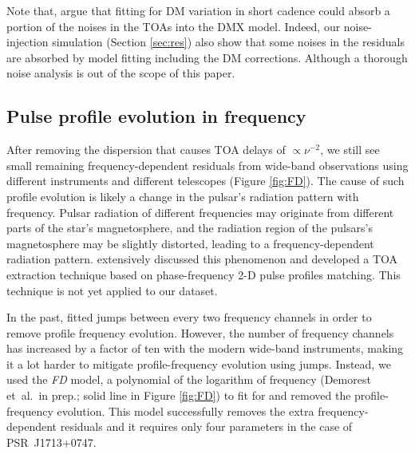 Note that, \citet{kcs+13} argue that fitting for DM variation in short cadence could
absorb a portion of the noises in the TOAs into the DMX model. 
Indeed, our noise-injection simulation (Section \ref{sec:res})
also show that some noises in the residuals are absorbed by model fitting
including the DM corrections. Although a thorough noise analysis is out of the scope of
this paper.


\subsection{Pulse profile evolution in frequency}
\label{sec:FD}
After removing the dispersion that causes TOA delays of $\propto \nu^{-2}$,
 we still see small remaining frequency-dependent residuals from wide-band
observations using
different instruments and different telescopes (Figure \ref{fig:FD}).  
The cause of such profile evolution is likely a change in the pulsar's
radiation pattern with frequency.  Pulsar radiation of different frequencies may originate from
different parts of the star's magnetosphere, and 
the radiation region of the pulsars's magnetosphere may be slightly distorted,
leading to a frequency-dependent radiation pattern. \citet{pdr14} 
extensively discussed this phenomenon and developed a TOA extraction technique
based on phase-frequency 2-D pulse profiles matching. This technique is not
yet applied to our dataset.

In the past, \citet{sns+05} fitted jumps
between every two frequency channels in order to remove profile frequency
evolution. However, the number of frequency
channels has increased by a factor of ten with the modern wide-band
instruments, making it a lot harder to mitigate profile-frequency evolution using jumps. 
Instead, we used the {\it FD} model, a polynomial of the logarithm of
frequency (Demorest et~al.\ in prep.; solid line in Figure
\ref{fig:FD}) to fit for and removed the profile-frequency
evolution. This model successfully removes the extra
frequency-dependent residuals and it requires only four parameters in the
case of PSR~J1713+0747.



